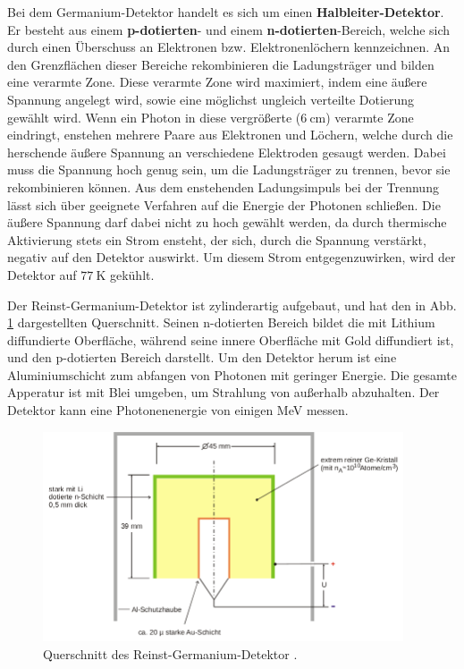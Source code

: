     Bei dem Germanium-Detektor handelt es sich um einen \textbf{Halbleiter-Detektor}.
    Er besteht aus einem \textbf{p-dotierten}- und einem \textbf{n-dotierten}-Bereich, welche
    sich durch einen Überschuss an Elektronen bzw. Elektronenlöchern kennzeichnen.
    An den Grenzflächen dieser Bereiche rekombinieren die Ladungsträger und bilden eine
    verarmte Zone. Diese verarmte Zone wird maximiert, indem eine äußere Spannung angelegt wird, sowie
    eine möglichst ungleich verteilte Dotierung gewählt wird. Wenn ein Photon in diese
    vergrößerte ($\SI{6}{\centi\meter}$) verarmte Zone eindringt, enstehen mehrere
    Paare aus Elektronen und Löchern, welche durch die herschende äußere Spannung an verschiedene
    Elektroden gesaugt werden. Dabei muss die Spannung hoch genug sein, um die Ladungsträger zu trennen,
    bevor sie rekombinieren können. Aus dem enstehenden Ladungsimpuls bei der Trennung lässt sich
    über geeignete Verfahren auf die Energie der Photonen schließen.
    Die äußere Spannung darf dabei nicht zu hoch gewählt werden, da durch
    thermische Aktivierung stets ein Strom ensteht, der sich, durch die Spannung verstärkt,
    negativ auf den Detektor auswirkt. Um diesem Strom entgegenzuwirken, wird der
    Detektor auf $\SI{77}{\kelvin}$ gekühlt.

    Der Reinst-Germanium-Detektor ist zylinderartig aufgebaut, und hat den in Abb. \ref{fig:detektor}
    dargestellten Querschnitt. Seinen n-dotierten Bereich bildet die mit Lithium diffundierte Oberfläche,
    während seine innere Oberfläche mit Gold diffundiert ist, und den p-dotierten Bereich darstellt.
    Um den Detektor herum ist eine Aluminiumschicht zum abfangen von Photonen mit geringer Energie.
    Die gesamte Apperatur ist mit Blei umgeben, um Strahlung von außerhalb abzuhalten.
    Der Detektor kann eine Photonenenergie von einigen MeV messen.
    \begin{figure}
      \centering
      \includegraphics[width=0.95\textwidth]{detektor.png}
      \caption{Querschnitt des Reinst-Germanium-Detektor \cite{anleitungv18}.}
      \label{fig:detektor}
    \end{figure}

